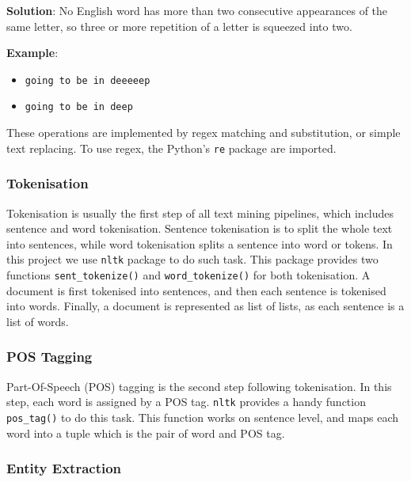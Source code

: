 \documentclass[conference]{IEEEtran}
\providecommand{\tightlist}{%
  \setlength{\itemsep}{0pt}\setlength{\parskip}{0pt}
}
\begin{document}
\begin{itemize}
  \textbf{Solution}: No English word has more than two consecutive
  appearances of the same letter, so three or more repetition of a
  letter is squeezed into two.

  \textbf{Example}:

  \begin{itemize}
  \tightlist
  \item
    \texttt{\footnotesize going to be in deeeeep}
  \item
     \texttt{\footnotesize going to be in deep}
  \end{itemize}
\end{itemize}

These operations are implemented by regex matching and substitution, or
simple text replacing. To use regex, the Python's \texttt{re} package
are imported.

\hypertarget{tokenisation}{%
\subsubsection{Tokenisation}\label{tokenisation}}

Tokenisation is usually the first step of all text mining pipelines,
which includes sentence and word tokenisation. Sentence tokenisation is
to split the whole text into sentences, while word tokenisation splits a
sentence into word or tokens. In this project we use \texttt{nltk}
package to do such task. This package provides two functions
\texttt{sent\_tokenize()} and \texttt{word\_tokenize()} for both
tokenisation. A document is first tokenised into sentences, and then
each sentence is tokenised into words. Finally, a document is
represented as list of lists, as each sentence is a list of words.

\hypertarget{pos-tagging}{%
\subsubsection{POS Tagging}\label{pos-tagging}}

Part-Of-Speech (POS) tagging is the second step following tokenisation.
In this step, each word is assigned by a POS tag. \texttt{nltk} provides
a handy function \texttt{pos\_tag()} to do this task. This function
works on sentence level, and maps each word into a tuple which is the
pair of word and POS tag.

\hypertarget{entity-extraction}{%
\subsubsection{Entity Extraction}\label{entity-extraction}}
\end{document}

